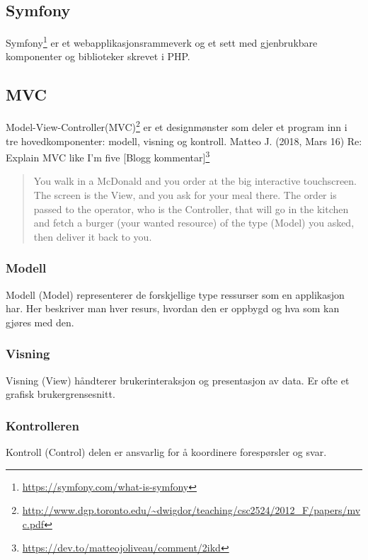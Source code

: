 \subsection{Symfony}
\label{sec:tools-symfony}
Symfony\footnote{\url{https://symfony.com/what-is-symfony}} er et webapplikasjonsrammeverk og et sett med gjenbrukbare komponenter og biblioteker skrevet i PHP.

\subsection{MVC}
\label{sec:tools-mvc}
Model-View-Controller(MVC)\footnote{\url{http://www.dgp.toronto.edu/~dwigdor/teaching/csc2524/2012_F/papers/mvc.pdf}} er et designmønster som deler et program inn i tre hovedkomponenter: modell, visning og kontroll.
Matteo J. (2018, Mars 16) Re: Explain MVC like I'm five [Blogg kommentar]\footnote{\url{https://dev.to/matteojoliveau/comment/2ikd}}
\begin{quote}
    You walk in a McDonald and you order at the big interactive touchscreen.
    The screen is the View, and you ask for your meal there.
    The order is passed to the operator, who is the Controller, that will go in the kitchen and fetch a burger (your wanted resource) of the type (Model) you asked, then deliver it back to you.
\end{quote}

\subsubsection{Modell}
Modell (Model) representerer de forskjellige type ressurser som en applikasjon har. Her beskriver man hver resurs, hvordan den er oppbygd og hva som kan gjøres med den.

\subsubsection{Visning}
Visning (View) håndterer brukerinteraksjon og presentasjon av data. Er ofte et grafisk brukergrensesnitt.

\subsubsection{Kontrolleren}
Kontroll (Control) delen er ansvarlig for å koordinere forespørsler og svar.

